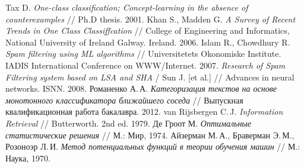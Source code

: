 \begin{thebibliography}{99}

 Tax D. \textit{One-class classification; Concept-learning in the absence of
counterexamples} // Ph.D thesis. 2001.
 Khan S., Madden G. \textit{A Survey of Recent Trends in One Class
Classiffcation} // College of Engineering and Informatics, National University of Ireland Galway.
Ireland. 2006.
 Islam R., Chowdhury R. \textit{Spam filtering using ML algorithms} // Universitetets Okonomiske Institute. IADIS International Conference on WWW/Internet. 2007.
 \textit{Research of Spam Filtering system based on LSA and SHA} / Sun J. [et al.] // Advances in neural networks. ISNN. 2008.
 Романенко А.\,А. \textit{Категоризация текстов на основе монотонного
классификатора ближайшего соседа} // Выпускная квалификационная работа бакалавра. 2012.
 van Rijsbergen C.\,J. \textit{Information Retrieval} // Butterworth. 2nd ed. 1979.
Де Гроот М. \textit{Оптимальные статистические решения} // М.: Мир, 1974.
 Айзерман М.\,А., Браверман Э.\,М., Розоноэр Л.\,И. \textit{Метод потенциальных функций в теории обучения машин} // М.: Наука, 1970.

\end{thebibliography}
